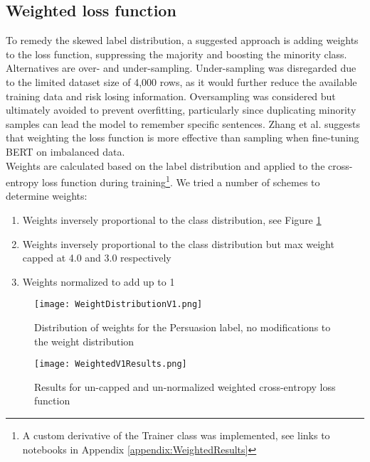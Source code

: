 \documentclass[
	letterpaper, %
	12pt, %
	unnumberedsections, %
	twoside, %
]{LTJournalArticle}
\begin{document}
\subsection{Weighted loss function}

To remedy the skewed label distribution, a suggested approach is adding weights to the loss function, suppressing the majority and boosting the minority class. Alternatives are over- and under-sampling. Under-sampling was disregarded due to the limited dataset size of 4,000 rows, as it would further reduce the available training data and risk losing information. Oversampling was considered but ultimately avoided to prevent overfitting, particularly since duplicating minority samples can lead the model to remember specific sentences. Zhang et al. \cite{zhang2020revisiting} suggests that weighting the loss function is more effective than sampling when fine-tuning BERT on imbalanced data. \\

Weights are calculated based on the label distribution and applied to the cross-entropy loss function during training\footnote{A custom derivative of the Trainer class was implemented, see links to notebooks in Appendix \ref{appendix:WeightedResults}}. We tried a number of schemes to determine weights:
\begin{enumerate}
	\item Weights inversely proportional to the class distribution, see Figure \ref{fig:V1WeightDistributionRaw}
	\item Weights inversely proportional to the class distribution but max weight capped at 4.0 and 3.0 respectively
	\item Weights normalized to add up to 1
\end{enumerate}



\begin{figure}[h]
	\centering
	\texttt{[image: WeightDistributionV1.png]}
	\caption{Distribution of weights for the Persuasion label, no modifications to the weight distribution}
	\label{fig:V1WeightDistributionRaw}
\end{figure}%

\begin{figure}[h]
	\centering
	\texttt{[image: WeightedV1Results.png]}

	\caption{Results for un-capped and un-normalized weighted cross-entropy loss function}
	\label{fig:V1WeightResultsRaw}
\end{figure}%
\end{document}
